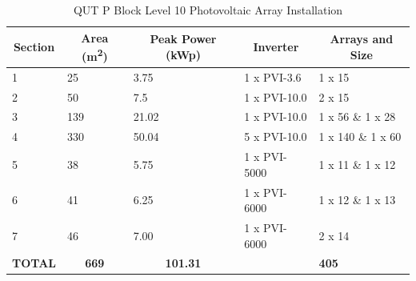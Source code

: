 \begin{table}[H]
	\centering
	\begin{tabular}{|l|l|l|l|l|}
		\hline
		\multicolumn{1}{|c|}{\textbf{Section}} & \multicolumn{1}{c|}{\textbf{Area (\si{m^2})}} & \multicolumn{1}{c|}{\textbf{Peak Power (kWp)}} & \multicolumn{1}{c|}{\textbf{Inverter}} & \multicolumn{1}{c|}{\textbf{Arrays and Size}} \\ \hline
		1                                      & 25                                 & 3.75                                           & 1 x PVI-3.6                            & 1 x 15                                        \\ \hline
		2                                      & 50                                 & 7.5                                            & 1 x PVI-10.0                           & 2 x 15                                        \\ \hline
		3                                      & 139                                & 21.02                                          & 1 x PVI-10.0                           & 1 x 56 \& 1 x 28                              \\ \hline
		4                                      & 330                                & 50.04                                          & 5 x PVI-10.0                           & 1 x 140 \& 1 x 60                             \\ \hline
		5                                      & 38                                 & 5.75                                           & 1 x PVI-5000                           & 1 x 11 \& 1 x 12                              \\ \hline
		6                                      & 41                                 & 6.25                                           & 1 x PVI-6000                           & 1 x 12 \& 1 x 13                              \\ \hline
		7                                      & 46                                 & 7.00                                           & 1 x PVI-6000                           & 2 x 14                                        \\ \hline
		\multicolumn{1}{|c|}{\textbf{TOTAL}}   & \multicolumn{1}{c|}{\textbf{669}}  & \multicolumn{1}{c|}{\textbf{101.31}}           &                                        & \textbf{405}                                               \\ \hline
	\end{tabular}
\caption{QUT P Block Level 10 Photovoltaic Array Installation}
\label{table:qut-pblock-lvl10-pv-breakdown}
\end{table}

